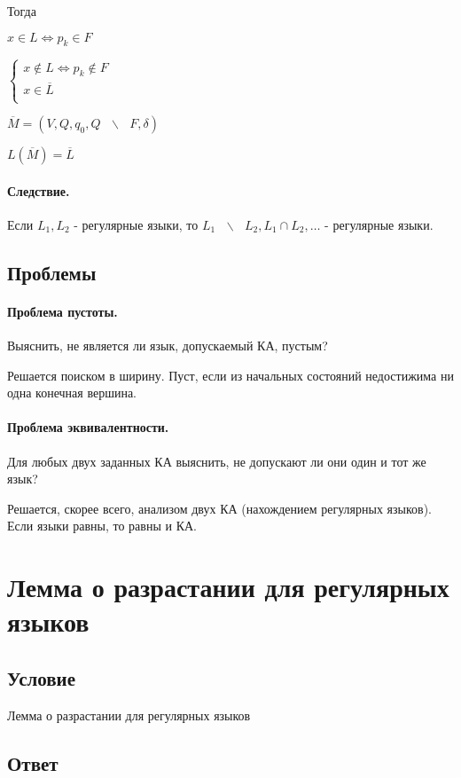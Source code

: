 \documentclass{report}
\newcommand{\bslash}{\mbox{ } \backslash \mbox{ }}
\begin{document}
Тогда

$x \in L \iff p_{k} \in F$ 

$
\begin{cases}
	x \not\in L \iff p_{k} \not\in F\\
	x \in \overline{L} \\
\end{cases}
$ 

\medskip

$\overline{M} = (V, Q, q_0, Q \bslash F, \delta)$ 

$L(\overline{M}) = \overline{L}$

\paragraph*{Следствие.}
Если $L_1, L_2$ - регулярные языки, то $L_1 \bslash L_2, L_1 \cap L_2, \ldots$ - регулярные языки.

\subsection{Проблемы}
\paragraph*{Проблема пустоты.}
Выяснить, не является ли язык, допускаемый КА, пустым?

Решается поиском в ширину. Пуст, если из начальных состояний
недостижима ни одна конечная вершина.

\paragraph*{Проблема эквивалентности.}
Для любых двух заданных КА выяснить, не допускают ли они один и тот же язык?

Решается, скорее всего, анализом двух КА (нахождением регулярных языков).
Если языки равны, то равны и КА.

\newpage

\section{Лемма о разрастании для регулярных языков}
\subsection{Условие}
Лемма о разрастании для регулярных языков

\subsection{Ответ}
\end{document}
